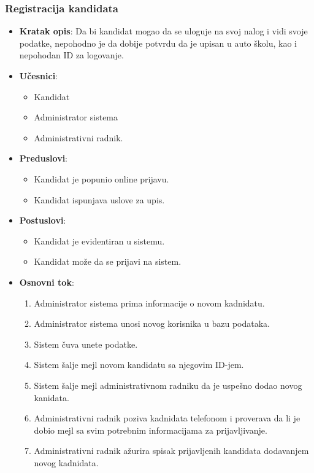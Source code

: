 \subsubsection{Registracija kandidata}
\label{subsubsec:registracija}
\begin{itemize}
  \item \textbf{Kratak opis}: Da bi kandidat mogao da se uloguje na svoj nalog i vidi svoje podatke, nepohodno je da dobije potvrdu da je upisan u auto školu, kao i nepohodan ID za logovanje.
  \item \textbf{Učesnici}:
  \begin{itemize}
    \item Kandidat
    \item Administrator sistema
    \item Administrativni radnik.
  \end{itemize}
  \item \textbf{Preduslovi}:
    \begin{itemize}
    \item  Kandidat je popunio online prijavu.
    \item  Kandidat ispunjava uslove za upis.
    \end{itemize}
  \item \textbf{Postuslovi}:
      \begin{itemize}
      \item Kandidat je evidentiran u sistemu.
      \item Kandidat može da se prijavi na sistem.
      \end{itemize}
  \item \textbf{Osnovni tok}:
      \begin{enumerate}
        \item Administrator sistema prima informacije o novom kadnidatu.
        \item Administrator sistema unosi novog korisnika u bazu podataka.
        \item Sistem čuva unete podatke.
        \item Sistem šalje mejl novom kandidatu sa njegovim ID-jem.
        \item Sistem šalje mejl administrativnom radniku da je uspešno dodao novog kanidata.
        \item Administrativni radnik poziva kadnidata telefonom i proverava da li je dobio mejl sa svim potrebnim informacijama za prijavljivanje.
        \item Administrativni radnik ažurira spisak prijavljenih kandidata dodavanjem novog kadnidata.    
      \end{enumerate}


\end{itemize}

